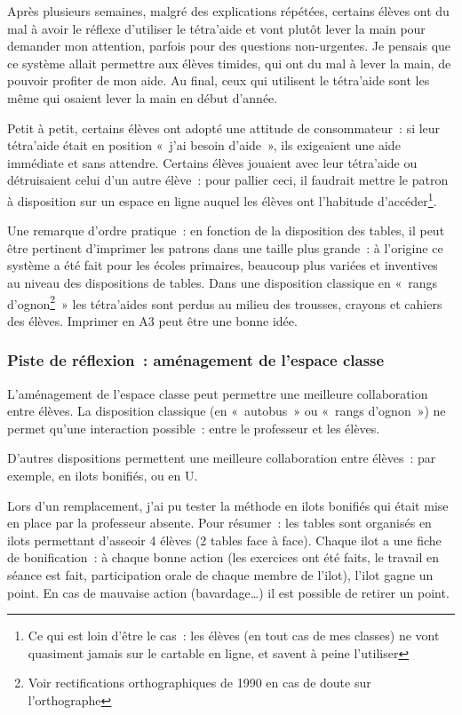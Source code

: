 Après plusieurs semaines, malgré des explications répétées, certains élèves ont du mal à avoir le réflexe
d'utiliser le tétra'aide et vont plutôt lever la main pour demander mon attention,
parfois pour des questions non-urgentes. Je pensais que ce système allait permettre
aux élèves timides, qui ont du mal à lever la main, de pouvoir profiter de mon aide.
Au final, ceux qui utilisent le tétra'aide sont les même qui osaient lever la main
en début d'année.

Petit à petit, certains élèves ont adopté une attitude de consommateur : si
leur tétra'aide était en position « j'ai besoin d'aide », ils exigeaient une
aide immédiate et sans attendre. Certains élèves jouaient avec leur tétra'aide ou
détruisaient celui d'un autre élève : pour pallier ceci, il faudrait mettre
le patron à disposition sur un espace en ligne auquel les élèves ont l'habitude
d'accéder\footnote{Ce qui est loin d'être le cas : les élèves (en tout cas de mes
classes) ne vont quasiment jamais sur le cartable en ligne, et savent à peine
l'utiliser}.

Une remarque d'ordre pratique : en fonction de la disposition des tables, il
peut être pertinent d'imprimer les patrons dans une taille plus grande : à
l'origine ce système a été fait pour les écoles primaires, beaucoup plus variées
et inventives au niveau des dispositions de tables. Dans une disposition classique
en « rangs d'ognon\footnote{Voir rectifications orthographiques de 1990 en cas de doute
sur l'orthographe} » les tétra'aides sont perdus au milieu des trousses, crayons
et cahiers des élèves. Imprimer en A3 peut être une bonne idée.

\subsubsection{Piste de réflexion : aménagement de l'espace classe}

L'aménagement de l'espace classe peut permettre une meilleure collaboration entre
élèves. La disposition classique (en « autobus » ou « rangs d'ognon ») ne permet
qu'une interaction possible : entre le professeur et les élèves.

D'autres dispositions permettent une meilleure collaboration entre élèves : par
exemple, en ilots bonifiés\cite{ilots_bonifies}, ou en U\cite{amenagement_classe}.

Lors d'un remplacement, j'ai pu tester la méthode en ilots bonifiés qui était mise
en place par la professeur absente. Pour résumer : les tables sont organisés
en ilots permettant d'asseoir 4 élèves (2 tables face à face). Chaque ilot a une
fiche de bonification : à chaque bonne action (les exercices ont été faits, le travail
en séance est fait, participation orale de chaque membre de l'ilot), l'ilot gagne un point.
En cas de mauvaise action (bavardage…) il est possible de retirer un point.

